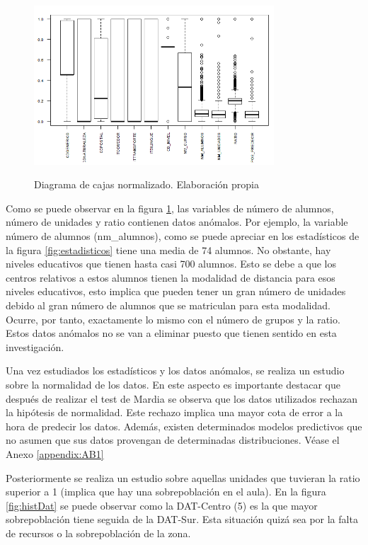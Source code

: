 \begin{figure}[htb]
	\centering
	\caption{Diagrama de cajas normalizado. Elaboración propia}
	\includegraphics[width=0.8\textwidth]{recursos/ImagenesR/boxplotNorm}
	\label{fig:boxplotNorm}
\end{figure}



Como se puede observar en la figura \ref{fig:boxplotNorm}, las variables de número de alumnos, número de unidades y ratio contienen datos anómalos. Por ejemplo, la variable número de alumnos (nm\_alumnos), como se puede apreciar en los estadísticos de la figura \ref{fig:estadisticos} tiene una media de 74 alumnos. No obstante, hay niveles educativos que tienen hasta casi 700 alumnos. Esto se debe a que los centros relativos a estos alumnos tienen la modalidad de distancia para esos niveles educativos, esto implica que pueden tener un gran número de unidades debido al gran número de alumnos que se matriculan para esta modalidad. Ocurre, por tanto, exactamente lo mismo con el número de grupos y la ratio. Estos datos anómalos no se van a eliminar puesto que tienen sentido en esta investigación.

Una vez estudiados los estadísticos y los datos anómalos, se realiza un estudio sobre la normalidad de los datos. En este aspecto es importante destacar que después de realizar el test de Mardia se observa que los datos utilizados rechazan la hipótesis de normalidad. Este rechazo implica una mayor cota de error a la hora de predecir los datos. Además, existen determinados modelos predictivos que no asumen que sus datos provengan de determinadas distribuciones. Véase el Anexo \ref{appendix:AB1}

Posteriormente se realiza un estudio sobre aquellas unidades que tuvieran la ratio superior a 1 (implica que hay una sobrepoblación en el aula). En la figura \ref{fig:histDat} se puede observar como la DAT-Centro (5) es la que mayor sobrepoblación tiene seguida de la DAT-Sur. Esta situación quizá sea por la falta de recursos o la sobrepoblación de la zona.

